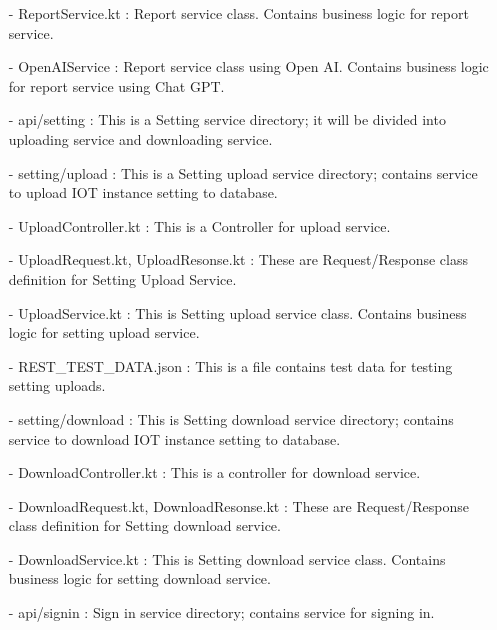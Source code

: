 \documentclass[conference]{IEEEtran}
\begin{document}
\begin{enumerate}
        \item [-] ReportService.kt :  Report service class. Contains business logic for report service.\\
        \item [-] OpenAIService : Report service class using Open AI. Contains business logic for report
service using Chat GPT.\\
        \item [-] api/setting : This is a Setting service directory; it will be divided into uploading service and downloading service.\\
        \item [-] setting/upload : This is a Setting upload service directory; contains service to upload IOT instance setting to database.\\
        \item [-] UploadController.kt : This is a Controller for upload service.\\
        \item [-] UploadRequest.kt, UploadResonse.kt : These are Request/Response class definition for Setting Upload Service.\\
        \item [-] UploadService.kt : This is Setting upload service class. Contains business logic for setting upload service.\\
        \item [-] REST\_TEST\_DATA.json : This is a file contains test data for testing setting uploads.\\
        \item [-] setting/download : This is Setting download service directory; contains service to download IOT instance setting to
database.\\
        \item [-] DownloadController.kt : This is a controller for download service.\\
        \item [-] DownloadRequest.kt, DownloadResonse.kt : These are Request/Response class definition for Setting download service.\\
        \item [-] DownloadService.kt : This is Setting download service class. Contains business logic for setting download service.\\
        \item [-] api/signin : Sign in service directory; contains service for signing in.\\

\end{enumerate}
\end{document}
